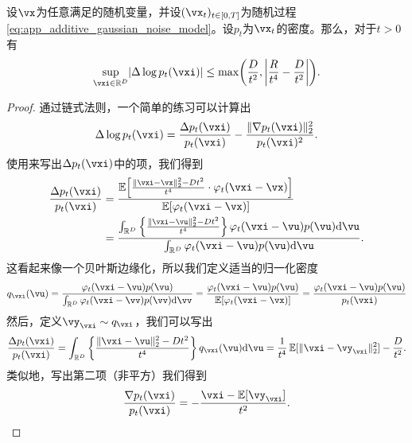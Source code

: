 \documentclass[../../book-main_zh.tex]{subfiles}
\begin{document}
\begin{lemma}\label{lem:app_diffusion_laplacian_control}
    设\(\vx\)为任意满足的随机变量，并设\((\vx_{t})_{t \in [0, T]}\)为随机过程\eqref{eq:app_additive_gaussian_noise_model}。设\(p_{t}\)为\(\vx_{t}\)的密度。那么，对于\(t > 0\)有
    \begin{equation}
        \sup_{\vxi \in \R^{D}}\abs{\Delta \log p_{t}(\vxi)} \leq \max\rp{\frac{D}{t^{2}}, \abs*{\frac{R}{t^{4}} - \frac{D}{t^{2}}}}.
    \end{equation}
\end{lemma}
\begin{proof}
    通过链式法则，一个简单的练习可以计算出
    \begin{equation}
        \Delta \log p_{t}(\vxi) = \frac{\Delta p_{t}(\vxi)}{p_{t}(\vxi)} - \frac{\norm{\nabla p_{t}(\vxi)}_{2}^{2}}{p_{t}(\vxi)^{2}}.
    \end{equation}
    使用来写出\(\Delta p_{t}(\vxi)\)中的项，我们得到
    \begin{align}
        \frac{\Delta p_{t}(\vxi)}{p_{t}(\vxi)}
        &= \frac{\Ex\rs{\frac{\norm{\vxi - \vx}_{2}^{2} - Dt^{2}}{t^{4}} \cdot \phi_{t}(\vxi - \vx)}}{\Ex[\phi_{t}(\vxi - \vx)]} \\
        &= \frac{\int_{\R^{D}}\bc{\frac{\norm{\vxi - \vu}_{2}^{2} - Dt^{2}}{t^{4}}}\phi_{t}(\vxi - \vu)p(\vu)\odif{\vu}}{\int_{\R^{D}}\phi_{t}(\vxi - \vu)p(\vu)\odif{\vu}}.
    \end{align}
    这看起来像一个贝叶斯边缘化，所以我们定义适当的归一化密度
    \begin{equation}
        q_{\vxi}(\vu) = \frac{\phi_{t}(\vxi - \vu)p(\vu)}{\int_{\R^{D}}\phi_{t}(\vxi - \vv)p(\vv)\odif{\vv}} = \frac{\phi_{t}(\vxi - \vu)p(\vu)}{\Ex[\phi_{t}(\vxi - \vx)]} = \frac{\phi_{t}(\vxi - \vu)p(\vu)}{p_{t}(\vxi)}
    \end{equation}
    然后，定义\(\vy_{\vxi} \sim q_{\vxi}\)，我们可以写出
    \begin{equation}
        \frac{\Delta p_{t}(\vxi)}{p_{t}(\vxi)} = \int_{\R^{D}}\bc{\frac{\norm{\vxi - \vu}_{2}^{2} - Dt^{2}}{t^{4}}}q_{\vxi}(\vu)\odif{\vu} = \frac{1}{t^{4}}\Ex[\norm{\vxi - \vy_{\vxi}}_{2}^{2}] - \frac{D}{t^{2}}.
    \end{equation}
    类似地，写出第二项（非平方）我们得到
    \begin{equation}
        \frac{\nabla p_{t}(\vxi)}{p_{t}(\vxi)} = -\frac{\vxi - \Ex[\vy_{\vxi}]}{t^{2}}.
    \end{equation}

\end{proof}
\end{document}
